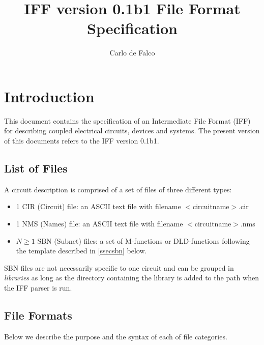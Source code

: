 \documentclass{scrartcl}
\title{IFF version 0.1b1 File Format Specification}
\author{Carlo de Falco}
\let\tt=\normalfont\ttfamily
\let\bf=\normalfont\bfseries
\newcommand{\Iff}{{\tt IFF}}
\newcommand{\cir}{{\tt CIR}}
\newcommand{\nms}{{\tt NMS}}
\newcommand{\sbn}{{\tt SBN}}
\newcommand{\ord}{{\tt ORD}}
\begin{document}
\maketitle

\section*{Introduction}

This document contains the specification of an {\bf I}ntermediate 
{\bf F}ile {\bf F}ormat ({\Iff}) for describing coupled electrical circuits, 
devices and systems.
The present version of this documents refers to the {\Iff} version 0.1b1.

\subsection{List of Files}
A circuit description is comprised of a set of files of three different types:
\begin{itemize}
\item  1 {\cir} ({\bf Cir}cuit) file: an {\tt ASCII } text file with filename 
{$<$circuitname$>$.cir} 
\item  1 {\nms} ({\bf N}a{\bf m}e{\bf s}) file: an {\tt ASCII } text file with 
filename {$<$circuitname$>$.nms} 
\item  $N \geq 1$ {\sbn} ({\bf S}u{\bf bn}et) files: a set of M-functions or 
DLD-functions following the template described in \autoref{ssecsbn} below. 
\end{itemize}
{\sbn} files are not necessarily specific to one circuit and can be grouped in 
\emph{libraries} as long as the directory containing the library is added to 
the path when the 
{\Iff} parser is run.

\subsection{File Formats}
Below we describe the purpose and the syntax of each of file categories.
\end{document}
